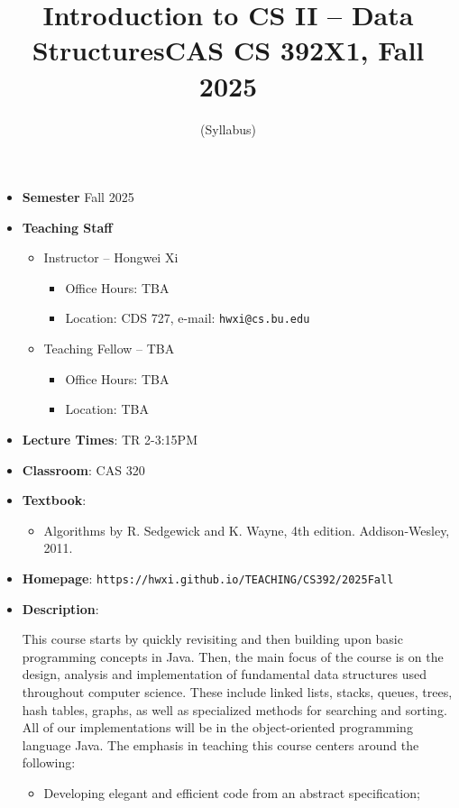 \documentclass[11pt]{article}
\title{Introduction to CS II -- Data Structures\break CAS CS 392X1, Fall 2025}
\author{(Syllabus)}
\date{}
\begin{document}
\maketitle
\thispagestyle{empty}

\begin{itemize}
\item {\bf Semester} Fall 2025
\item {\bf Teaching Staff}
\begin{itemize}
\item
Instructor -- Hongwei Xi
\begin{itemize}
\item
Office Hours: TBA
\item
Location: CDS 727, e-mail: \texttt{hwxi@cs.bu.edu}
\end{itemize}

\item
Teaching Fellow -- TBA
\begin{itemize}
\item
Office Hours: TBA
\item
Location: TBA
\end{itemize}
\end{itemize}

\item {\bf Lecture Times}: TR 2-3:15PM
\item {\bf Classroom}: CAS 320
\item {\bf Textbook}:\kern6pt
\begin{itemize}
\item
Algorithms by R. Sedgewick and K. Wayne, 4th edition. Addison-Wesley, 2011.
\end{itemize}

\item {\bf Homepage}:
{\tt  https://hwxi.github.io/TEACHING/CS392/2025Fall}

\item {\bf Description}:

This course starts by quickly revisiting and then building upon basic
programming concepts in Java. Then, the main focus of the course is on
the design, analysis and implementation of fundamental data structures
used throughout computer science. These include linked lists, stacks,
queues, trees, hash tables, graphs, as well as specialized methods for
searching and sorting. All of our implementations will be in the
object-oriented programming language Java. The emphasis in teaching
this course centers around the following:

\begin{itemize}
\item
Developing elegant and efficient code from an abstract specification;


\end{itemize}
\end{itemize}
\end{document}
